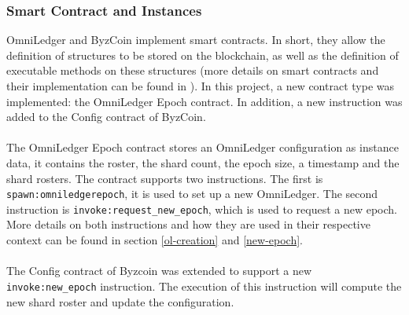 \subsubsection{Smart Contract and Instances}
OmniLedger and ByzCoin implement smart contracts. In short, they allow the definition of structures to be stored on the blockchain, as well as the definition of executable methods on these structures (more details on smart contracts and their implementation can be found in \cite{smart_contracts}). In this project, a new contract type was implemented: the OmniLedger Epoch contract. In addition, a new instruction was added to the Config contract of ByzCoin. \\\\
The OmniLedger Epoch contract stores an OmniLedger configuration as instance data, it contains the roster, the shard count, the epoch size, a timestamp and the shard rosters. The contract supports two instructions. The first is \texttt{spawn:omniledgerepoch}, it is used to set up a new OmniLedger. The second instruction is \texttt{invoke:request\_new\_epoch}, which is used to request a new epoch. More details on both instructions and how they are used in their respective context can be found in section \ref{ol-creation}  and \ref{new-epoch}.\\\\
The Config contract of Byzcoin was extended to support a new \texttt{invoke:new\_epoch} instruction. The execution of this instruction will compute the new shard roster and update the configuration.